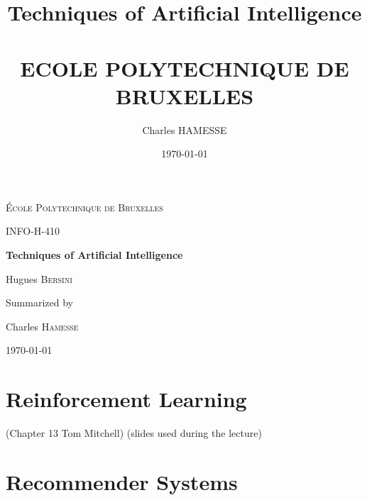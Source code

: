 \documentclass[a4paper]{book}
\author{Charles HAMESSE}
\title{Techniques of Artificial Intelligence \\~\\ ECOLE POLYTECHNIQUE DE BRUXELLES\\}
\date{\today}
\begin{document}
\begin{titlepage}
	\centering
	\vspace{1cm}
	{\scshape\LARGE École Polytechnique de Bruxelles \par}
	\vspace{2cm}
	{\scshape\Large INFO-H-410\par}
	\vspace{.5cm}
	{\huge\bfseries Techniques of Artificial Intelligence\par}
	\vspace{2cm}
	{\Large Hugues \textsc{Bersini}\par}
	\vfill
	Summarized by\par
	Charles \textsc{Hamesse}

	\vfill

	{\large \today\par}
\end{titlepage}
\tableofcontents
\tableofcontents





\chapter{Reinforcement Learning}
(Chapter 13 Tom Mitchell)
(slides used during the lecture)
\chapter{Recommender Systems}
\end{document}
